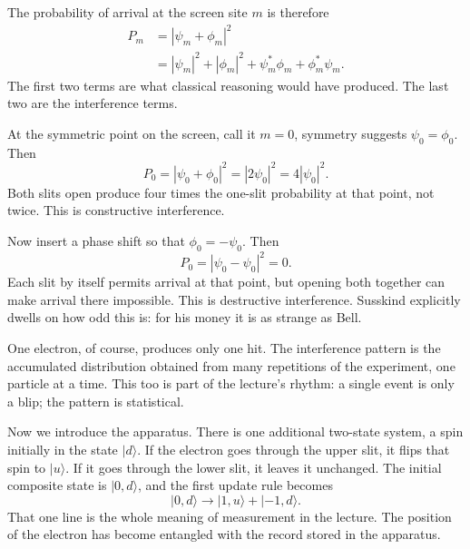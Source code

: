 The probability of arrival at the screen site \(m\) is therefore
\begin{align}
P_m &= |\psi_m+\phi_m|^2 \\
    &= |\psi_m|^2 + |\phi_m|^2 + \psi_m^*\phi_m + \phi_m^*\psi_m.
\end{align}
The first two terms are what classical reasoning would have produced. The last two are the interference terms.

At the symmetric point on the screen, call it \(m=0\), symmetry suggests \(\psi_0=\phi_0\). Then
\begin{equation}
P_0 = |\psi_0+\phi_0|^2 = |2\psi_0|^2 = 4|\psi_0|^2.
\end{equation}
Both slits open produce four times the one-slit probability at that point, not twice. This is constructive interference.

Now insert a phase shift so that \(\phi_0=-\psi_0\). Then
\begin{equation}
P_0 = |\psi_0-\psi_0|^2 = 0.
\end{equation}
Each slit by itself permits arrival at that point, but opening both together can make arrival there impossible. This is destructive interference. Susskind explicitly dwells on how odd this is: for his money it is as strange as Bell.

One electron, of course, produces only one hit. The interference pattern is the accumulated distribution obtained from many repetitions of the experiment, one particle at a time. This too is part of the lecture's rhythm: a single event is only a blip; the pattern is statistical.

Now we introduce the apparatus. There is one additional two-state system, a spin initially in the state \(|d\rangle\). If the electron goes through the upper slit, it flips that spin to \(|u\rangle\). If it goes through the lower slit, it leaves it unchanged. The initial composite state is \(|0,d\rangle\), and the first update rule becomes
\begin{equation}
|0,d\rangle \longrightarrow |1,u\rangle + |-1,d\rangle.
\end{equation}
That one line is the whole meaning of measurement in the lecture. The position of the electron has become entangled with the record stored in the apparatus.


